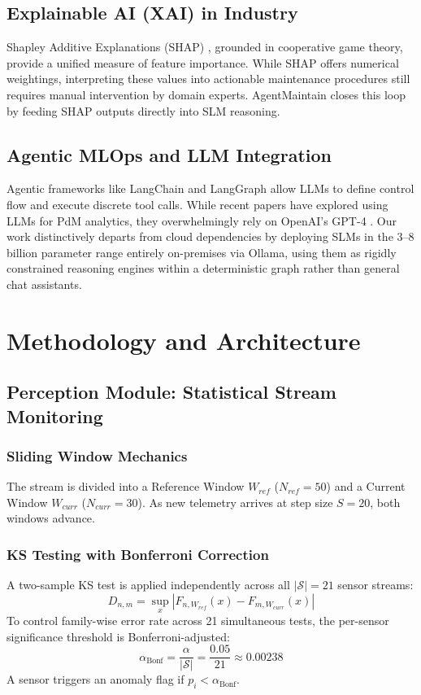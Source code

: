 \documentclass[conference, 10pt]{IEEEtran}
\begin{document}
\subsection{Explainable AI (XAI) in Industry}
Shapley Additive Explanations (SHAP) \cite{shap}, grounded in cooperative game theory, provide a unified measure of feature importance. While SHAP offers numerical weightings, interpreting these values into actionable maintenance procedures still requires manual intervention by domain experts. AgentMaintain closes this loop by feeding SHAP outputs directly into SLM reasoning.

\subsection{Agentic MLOps and LLM Integration}
Agentic frameworks like LangChain and LangGraph \cite{langgraph} allow LLMs to define control flow and execute discrete tool calls. While recent papers have explored using LLMs for PdM analytics, they overwhelmingly rely on OpenAI's GPT-4 \cite{mlops}. Our work distinctively departs from cloud dependencies by deploying SLMs in the 3--8 billion parameter range entirely on-premises via Ollama, using them as rigidly constrained reasoning engines within a deterministic graph rather than general chat assistants.


\section{Methodology and Architecture}

\subsection{Perception Module: Statistical Stream Monitoring}
\subsubsection{Sliding Window Mechanics}
The stream is divided into a Reference Window $W_{ref}$ ($N_{ref} = 50$) and a Current Window $W_{curr}$ ($N_{curr} = 30$). As new telemetry arrives at step size $S = 20$, both windows advance.

\subsubsection{KS Testing with Bonferroni Correction}
A two-sample KS test is applied independently across all $|\mathcal{S}| = 21$ sensor streams:
\begin{equation}
D_{n,m} = \sup_{x} | F_{n, W_{ref}}(x) - F_{m, W_{curr}}(x) |
\end{equation}
To control family-wise error rate across 21 simultaneous tests, the per-sensor significance threshold is Bonferroni-adjusted:
\begin{equation}
\alpha_{\text{Bonf}} = \frac{\alpha}{|\mathcal{S}|} = \frac{0.05}{21} \approx 0.00238
\end{equation}
A sensor triggers an anomaly flag if $p_i < \alpha_{\text{Bonf}}$.
\end{document}
